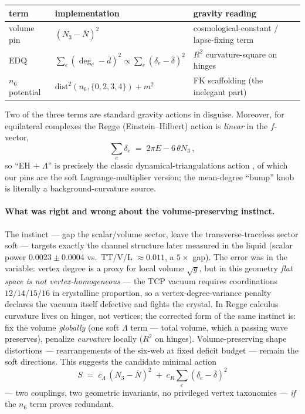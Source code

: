 \documentclass[11pt]{article}
\newcommand{\Nfk}{n_6}
\begin{document}
\begin{center}
\begin{tabular}{lll}
\toprule
term & implementation & gravity reading \\
\midrule
volume pin & $(N_3-\bar N)^2$ & cosmological-constant / lapse-fixing term \\
EDQ & $\sum_e (\deg_e - \bar d)^2 \propto \sum_e(\delta_e-\bar\delta)^2$ &
$R^2$ curvature-square on hinges \cite{hamber-williams} \\
$n_6$ potential & $\mathrm{dist}^2(\Nfk,\{0,2,3,4\}) + m^2$ &
FK scaffolding (the inelegant part) \\
\bottomrule
\end{tabular}
\end{center}

Two of the three terms are standard gravity actions in disguise. Moreover,
for equilateral complexes the Regge (Einstein--Hilbert) action is
\emph{linear} in the $f$-vector,
\begin{equation}
\sum_e \delta_e \;=\; 2\pi E - 6\,\theta N_3\,,
\end{equation}
so ``EH $+$ $\Lambda$'' is precisely the classic dynamical-triangulations
action \cite{ajl}, of which our pins are the soft Lagrange-multiplier
version; the mean-degree ``bump'' knob is literally a background-curvature
source.

\paragraph{What was right and wrong about the volume-preserving instinct.}
The instinct --- gap the scalar/volume sector, leave the transverse-traceless
sector soft --- targets exactly the channel structure later measured in the
liquid (scalar power $0.0023\pm0.0004$ vs.\ TT/V/L $\approx 0.011$, a
$5\times$ gap). The error was in the variable: vertex degree is a proxy for
local volume $\sqrt g$, but in this geometry \emph{flat space is not
vertex-homogeneous} --- the TCP vacuum requires coordinations
$12/14/15/16$ in crystalline proportion, so a vertex-degree-variance penalty
declares the vacuum itself defective and fights the crystal. In Regge
calculus curvature lives on hinges, not vertices; the corrected form of the
same instinct is: fix the volume \emph{globally} (one soft $\Lambda$ term
--- total volume, which a passing wave preserves), penalize \emph{curvature}
locally ($R^2$ on hinges). Volume-preserving shape distortions ---
rearrangements of the six-web at fixed deficit budget --- remain the soft
directions. This suggests the candidate minimal action
\begin{equation}
\boxed{\;S \;=\; c_\Lambda\,(N_3-\bar N)^2 \;+\;
c_R \sum_e (\delta_e - \bar\delta)^2\;}
\label{eq:twoterm}
\end{equation}
--- two couplings, two geometric invariants, no privileged vertex
taxonomies --- \emph{if} the $n_6$ term proves redundant.
\end{document}
